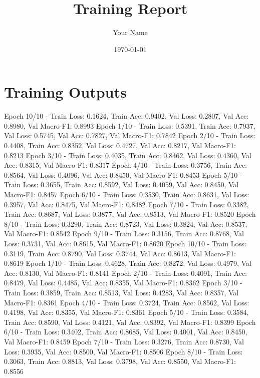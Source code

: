 \documentclass{article}
\title{Training Report}
\author{Your Name}
\date{\today}
\begin{document}
\maketitle
\tableofcontents
\newpage

\section{Training Outputs}

% 

Epoch 10/10 - Train Loss: 0.1624, Train Acc: 0.9402, Val Loss: 0.2807, Val Acc: 0.8980, Val Macro-F1: 0.8993
Epoch 1/10 - Train Loss: 0.5391, Train Acc: 0.7937, Val Loss: 0.5745, Val Acc: 0.7827, Val Macro-F1: 0.7842
Epoch 2/10 - Train Loss: 0.4408, Train Acc: 0.8352, Val Loss: 0.4727, Val Acc: 0.8217, Val Macro-F1: 0.8213
Epoch 3/10 - Train Loss: 0.4035, Train Acc: 0.8462, Val Loss: 0.4360, Val Acc: 0.8315, Val Macro-F1: 0.8317
Epoch 4/10 - Train Loss: 0.3756, Train Acc: 0.8564, Val Loss: 0.4096, Val Acc: 0.8450, Val Macro-F1: 0.8453
Epoch 5/10 - Train Loss: 0.3655, Train Acc: 0.8592, Val Loss: 0.4059, Val Acc: 0.8450, Val Macro-F1: 0.8457
Epoch 6/10 - Train Loss: 0.3530, Train Acc: 0.8631, Val Loss: 0.3957, Val Acc: 0.8475, Val Macro-F1: 0.8482
Epoch 7/10 - Train Loss: 0.3382, Train Acc: 0.8687, Val Loss: 0.3877, Val Acc: 0.8513, Val Macro-F1: 0.8520
Epoch 8/10 - Train Loss: 0.3290, Train Acc: 0.8723, Val Loss: 0.3824, Val Acc: 0.8537, Val Macro-F1: 0.8542
Epoch 9/10 - Train Loss: 0.3156, Train Acc: 0.8768, Val Loss: 0.3731, Val Acc: 0.8615, Val Macro-F1: 0.8620
Epoch 10/10 - Train Loss: 0.3119, Train Acc: 0.8790, Val Loss: 0.3744, Val Acc: 0.8613, Val Macro-F1: 0.8619
Epoch 1/10 - Train Loss: 0.4628, Train Acc: 0.8272, Val Loss: 0.4979, Val Acc: 0.8130, Val Macro-F1: 0.8141
Epoch 2/10 - Train Loss: 0.4091, Train Acc: 0.8479, Val Loss: 0.4485, Val Acc: 0.8355, Val Macro-F1: 0.8362
Epoch 3/10 - Train Loss: 0.3859, Train Acc: 0.8513, Val Loss: 0.4283, Val Acc: 0.8357, Val Macro-F1: 0.8361
Epoch 4/10 - Train Loss: 0.3724, Train Acc: 0.8562, Val Loss: 0.4198, Val Acc: 0.8355, Val Macro-F1: 0.8361
Epoch 5/10 - Train Loss: 0.3584, Train Acc: 0.8590, Val Loss: 0.4121, Val Acc: 0.8392, Val Macro-F1: 0.8399
Epoch 6/10 - Train Loss: 0.3402, Train Acc: 0.8685, Val Loss: 0.4001, Val Acc: 0.8450, Val Macro-F1: 0.8459
Epoch 7/10 - Train Loss: 0.3276, Train Acc: 0.8730, Val Loss: 0.3935, Val Acc: 0.8500, Val Macro-F1: 0.8506
Epoch 8/10 - Train Loss: 0.3063, Train Acc: 0.8813, Val Loss: 0.3798, Val Acc: 0.8550, Val Macro-F1: 0.8556
\end{document}
